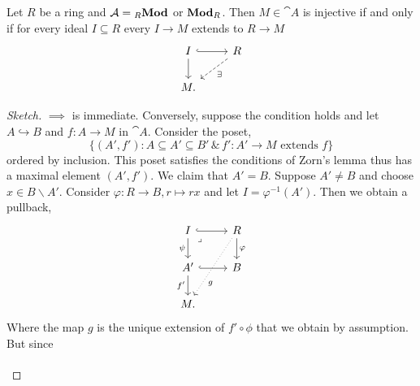 \documentclass[../main.tex]{subfiles}
\begin{document}
\begin{lem}
    Let $R$ be a ring and $\cat A =  {}_R\catModule$ or $\catModule[R]$. Then $M\in \cat A$ is injective if and only if for every ideal $I\subseteq R$ every $I\to M$ extends to $R\to M$
\[\begin{tikzcd}
	I & R \\
	M.
	\arrow[hook, from=1-1, to=1-2]
	\arrow[from=1-1, to=2-1]
	\arrow["\exists", dashed, from=1-2, to=2-1]
\end{tikzcd}\]
\end{lem}
\begin{proof}[Sketch]
    $\implies$ is immediate. Conversely, suppose the condition holds and let $A\hookrightarrow B$ and $f\colon A\to M$ in $\cat A$. Consider the poset,
    \[\{(A', f')\colon A\subseteq A' \subseteq B' \,\&\, f'\colon A' \to M \text{ extends } f\}\]
    ordered by inclusion. This poset satisfies the conditions of Zorn's lemma thus has a maximal element $(A', f')$. We claim that $A' = B$. Suppose $A' \neq B$ and choose $x\in B\backslash A'$. Consider $\varphi\colon R \to B, r\mapsto rx$ and let $I = \varphi^{-1}(A')$. Then we obtain a pullback,
    \[\begin{tikzcd}
    	I & R \\
    	{A'} & B \\
    	M.
    	\arrow[hook, from=1-1, to=1-2]
    	\arrow["\psi"', from=1-1, to=2-1]
    	\arrow["\lrcorner"{anchor=center, pos=0.125}, draw=none, from=1-1, to=2-2]
    	\arrow["\varphi", from=1-2, to=2-2]
    	\arrow["g"{pos=0.7}, dotted, from=1-2, to=3-1]
    	\arrow[hook, from=2-1, to=2-2]
    	\arrow["{f'}"', from=2-1, to=3-1]
    \end{tikzcd}\]
    Where the map $g$ is the unique extension of $f'\circ \phi$ that we obtain by assumption. But since
    \[\begin{tikzcd}[column sep=scriptsize]

\end{tikzcd}\]
\end{proof}
\end{document}
